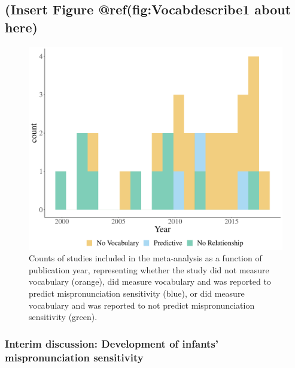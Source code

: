 \documentclass[man]{apa6}
\begin{document}
\hypertarget{insert-figure-reffigvocabdescribe1-about-here}{%
\subsection{(Insert Figure @ref(fig:Vocabdescribe1 about here)}\label{insert-figure-reffigvocabdescribe1-about-here}}

\begin{figure}
\centering
\includegraphics{VonHolzenBergmann_MPMetaAnalysis_files/figure-latex/Vocabdescribe1-1.pdf}
\caption{\label{fig:Vocabdescribe1}Counts of studies included in the meta-analysis as a function of publication year, representing whether the study did not measure vocabulary (orange), did measure vocabulary and was reported to predict mispronunciation sensitivity (blue), or did measure vocabulary and was reported to not predict mispronunciation sensitivity (green).}
\end{figure}

\hypertarget{interim-discussion-development-of-infants-mispronunciation-sensitivity}{%
\subsubsection{Interim discussion: Development of infants' mispronunciation sensitivity}\label{interim-discussion-development-of-infants-mispronunciation-sensitivity}}
\end{document}
